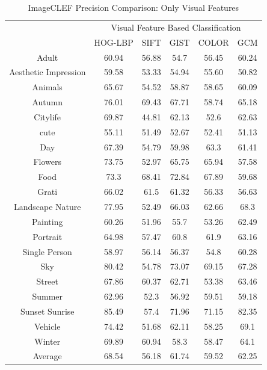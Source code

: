 \begin{table}
\centering
\caption{ ImageCLEF Precision Comparison: Only Visual Features} %
\vspace*{0.2 cm}
\begin{tabular}{| c | c | c | c | c | c |}
\hline
 {\multirow{2}{*}{Labels}} & \multicolumn{5}{|c|}{Visual Feature Based Classification} \\ 
 \cline{2-6}
 & HOG-LBP & SIFT & GIST & COLOR & GCM \\  [1ex] \hline
Adult & 60.94 & 56.88 & 54.7 & 56.45 & 60.24 \\  [1ex] \hline
Aesthetic Impression & 59.58 & 53.33 & 54.94 & 55.60 & 50.82 \\  [1ex] \hline
Animals & 65.67 & 54.52 & 58.87 & 58.65 & 60.09 \\  [1ex] \hline
Autumn & 76.01 & 69.43 & 67.71 & 58.74 & 65.18 \\  [1ex] \hline
Citylife & 69.87 & 44.81 & 62.13 & 52.6 & 62.63 \\  [1ex] \hline
cute & 55.11 & 51.49 & 52.67 & 52.41 & 51.13 \\  [1ex] \hline
Day & 67.39 & 54.79 & 59.98 & 63.3 & 61.41 \\  [1ex] \hline
Flowers & 73.75 & 52.97 & 65.75 & 65.94 & 57.58 \\  [1ex] \hline
Food & 73.3 & 68.41 & 72.84 & 67.89 & 59.68 \\  [1ex] \hline
Grati & 66.02 & 61.5 & 61.32 & 56.33 & 56.63 \\  [1ex] \hline
Landscape Nature & 77.95 & 52.49 & 66.03 & 62.66 & 68.3 \\  [1ex] \hline
Painting & 60.26 & 51.96 & 55.7 & 53.26 & 62.49 \\  [1ex] \hline
Portrait & 64.98 & 57.47 & 60.8 & 61.9 & 63.16 \\  [1ex] \hline
Single Person & 58.97 & 56.14 & 56.37 & 54.8 & 60.28 \\  [1ex] \hline
Sky & 80.42 & 54.78 & 73.07 & 69.15 & 67.28 \\  [1ex] \hline
Street & 67.86 & 60.37 & 62.71 & 53.38 & 63.46 \\  [1ex] \hline
Summer & 62.96 & 52.3 & 56.92 & 59.51 & 59.18 \\  [1ex] \hline
Sunset Sunrise & 85.49 & 57.4 & 71.96 & 71.15 & 82.35 \\  [1ex] \hline
Vehicle & 74.42 & 51.68 & 62.11 & 58.25 & 69.1 \\  [1ex] \hline
Winter & 69.89 & 60.94 & 58.3 & 58.47 & 64.1 \\  [1ex] \hline
Average & 68.54 & 56.18 & 61.74 & 59.52 & 62.25 \\  [1ex] \hline
\end{tabular}
\label{ImageCLEFPrecisionVisual} %
\end{table}

